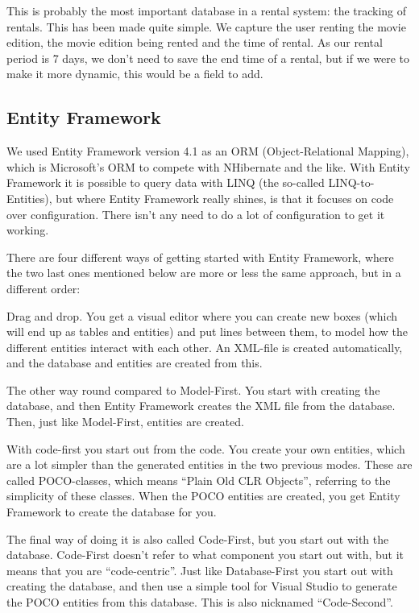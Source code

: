 This is probably the most important database in a rental system: the tracking of rentals. This has been made quite simple. We capture the user renting the movie edition, the movie edition being rented and the time of rental. As our rental period is 7 days, we don't need to save the end time of a rental, but if we were to make it more dynamic, this would be a field to add.

\subsection{Entity Framework}
\label{Design_Database_EntityFramework}

We used Entity Framework version 4.1 as an ORM (Object-Relational Mapping), which is Microsoft's ORM to compete with NHibernate and the like. With Entity Framework it is possible to query data with LINQ (the so-called LINQ-to-Entities), but where Entity Framework really shines, is that it focuses on code over configuration. There isn't any need to do a lot of configuration to get it working.

There are four different ways of getting started with Entity Framework, where the two last ones mentioned below are more or less the same approach, but in a different order:

\begin{my_description}
\item[Model-First] Drag and drop. You get a visual editor where you can create new boxes (which will end up as tables and entities) and put lines between them, to model how the different entities interact with each other. An XML-file is created automatically, and the database and entities are created from this.
\item[Database-First] The other way round compared to Model-First. You start with creating the database, and then Entity Framework creates the XML file from the database. Then, just like Model-First, entities are created.
\item[Code-First] With code-first you start out from the code. You create your own entities, which are a lot simpler than the generated entities in the two previous modes. These are called POCO-classes, which means ``Plain Old CLR Objects'', referring to the simplicity of these classes. When the POCO entities are created, you get Entity Framework to create the database for you.
\item[Code-First] The final way of doing it is also called Code-First, but you start out with the database. Code-First doesn't refer to what component you start out with, but it means that you are ``code-centric''. Just like Database-First you start out with creating the database, and then use a simple tool for Visual Studio to generate the POCO entities from this database. This is also nicknamed ``Code-Second''.
\end{my_description}

